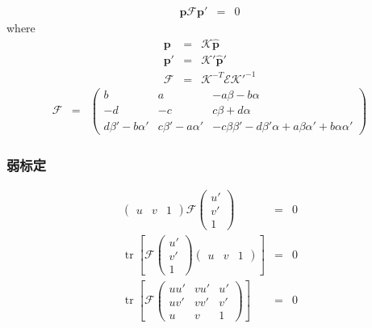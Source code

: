 \documentclass{beamer}
\newcommand{\nospace}{}
\newcommand{\tmmathbf}[1]{\ensuremath{\boldsymbol{#1}}}
\newcommand{\tmop}[1]{\ensuremath{\operatorname{#1}}}
\begin{document}
{{\begin{frame}
  
  \begin{eqnarray*}
    \tmmathbf{p}\mathcal{F}\tmmathbf{p}' & = & 0
  \end{eqnarray*}
  where
  \begin{eqnarray*}
    \tmmathbf{p} & = & \mathcal{K} \hat{\tmmathbf{p}}\\
    \tmmathbf{p}' & = & \mathcal{K}' \hat{\tmmathbf{p}}'\\
    \mathcal{F} & = & \mathcal{K}^{- T} {\mathcal{E}\mathcal{K}'}^{- 1}
  \end{eqnarray*}
  \begin{eqnarray*}
    \mathcal{F} & = & \left(\begin{array}{ccc}
      b & a & - a \beta - b \alpha\\
      - d & - c & c \beta + d \alpha\\
      d \beta' - b \alpha' & c \beta' - a \alpha' & - c \beta \beta' - d
      \beta' \alpha + a \beta \alpha' + b \alpha \alpha'
    \end{array}\right)
  \end{eqnarray*}
\end{frame}}{\begin{frame}
  \frametitle{弱标定}
  \begin{eqnarray*}
    \left(\begin{array}{ccc}
      u & v & 1
    \end{array}\right) \mathcal{F} \left(\begin{array}{c}
      u'\\
      v'\\
      1
    \end{array}\right) & = & 0\\
    \tmop{tr} \left[ \mathcal{F} \left(\begin{array}{c}
      u'\\
      v'\\
      1
    \end{array}\right) \left(\begin{array}{ccc}
      u & v & 1
    \end{array}\right) \right] & = & 0\\
    \tmop{tr} \left[ \mathcal{F} \left(\begin{array}{ccc}
      u \nospace \nospace u' & v \nospace \nospace u' & \nospace u'\\
      u \nospace v' & v \nospace v' & v'\\
      u & v & 1
    \end{array}\right) \right] & = & 0
  \end{eqnarray*}
\end{frame}}{\begin{frame}
  

\end{frame}}}
\end{document}
